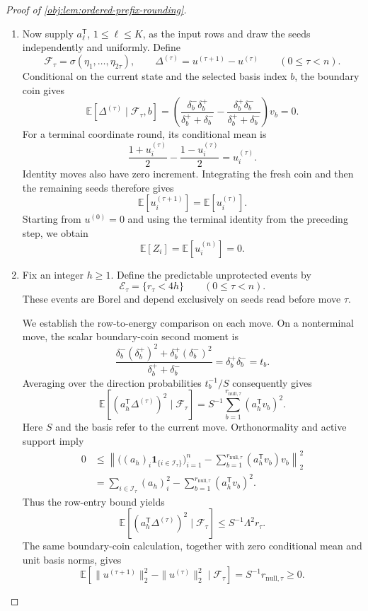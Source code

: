 \documentclass[11pt]{article}
\begin{document}
\begin{proof}[Proof of \cref{obj:lem:ordered-prefix-rounding}]
\begin{enumerate}
\item
Now supply \(a_\ell^{\mathsf T}\), \(1\leq\ell\leq K\), as the input rows and draw the seeds independently and uniformly. Define
\[
\mathcal F_\tau=\sigma(\eta_1,\ldots,\eta_{2\tau}),
\qquad
\Delta^{(\tau)}=u^{(\tau+1)}-u^{(\tau)}
\qquad(0\leq\tau<n).
\]
Conditional on the current state and the selected basis index \(b\), the boundary coin gives
\[
\mathbb E[\Delta^{(\tau)}\mid\mathcal F_\tau,b]
=
\left(
\frac{\delta_b^-\delta_b^+}{\delta_b^++\delta_b^-}
-
\frac{\delta_b^+\delta_b^-}{\delta_b^++\delta_b^-}
\right)v_b
=0.
\]
For a terminal coordinate round, its conditional mean is
\[
\frac{1+u_i^{(\tau)}}2
-
\frac{1-u_i^{(\tau)}}2
=u_i^{(\tau)}.
\]
Identity moves also have zero increment. Integrating the fresh coin and then the remaining seeds therefore gives
\[
\mathbb E[u_i^{(\tau+1)}]
=\mathbb E[u_i^{(\tau)}].
\]
Starting from \(u^{(0)}=0\) and using the terminal identity from the preceding step, we obtain
\[
\mathbb E[Z_i]=\mathbb E[u_i^{(n)}]=0.
\]

\item
Fix an integer \(h\geq1\). Define the predictable unprotected events by
\[
\mathcal E_\tau=\{r_\tau<4h\}
\qquad(0\leq\tau<n).
\]
These events are Borel and depend exclusively on seeds read before move \(\tau\).

We establish the row-to-energy comparison on each move. On a nonterminal move, the scalar boundary-coin second moment is
\[
\frac{\delta_b^-(\delta_b^+)^2+\delta_b^+(\delta_b^-)^2}
{\delta_b^++\delta_b^-}
=\delta_b^+\delta_b^-=t_b.
\]
Averaging over the direction probabilities \(t_b^{-1}/S\) consequently gives
\[
\mathbb E\!\left[(a_h^{\mathsf T}\Delta^{(\tau)})^2\mid\mathcal F_\tau\right]
=
S^{-1}\sum_{b=1}^{r_{\mathrm{null},\tau}}
(a_h^{\mathsf T}v_b)^2.
\]
Here \(S\) and the basis refer to the current move. Orthonormality and active support imply
\[
\begin{aligned}
0
&\leq
\left\|
\bigl((a_h)_i\mathbf1_{\{i\in\mathcal I_\tau\}}\bigr)_{i=1}^n
-
\sum_{b=1}^{r_{\mathrm{null},\tau}}
(a_h^{\mathsf T}v_b)v_b
\right\|_2^2\\
&=
\sum_{i\in\mathcal I_\tau}(a_h)_i^2
-
\sum_{b=1}^{r_{\mathrm{null},\tau}}(a_h^{\mathsf T}v_b)^2.
\end{aligned}
\]
Thus the row-entry bound yields
\[
\mathbb E\!\left[(a_h^{\mathsf T}\Delta^{(\tau)})^2\mid\mathcal F_\tau\right]
\leq S^{-1}\Lambda^2r_\tau.
\]
The same boundary-coin calculation, together with zero conditional mean and unit basis norms, gives
\[
\mathbb E\!\left[
\|u^{(\tau+1)}\|_2^2-\|u^{(\tau)}\|_2^2
\mid\mathcal F_\tau\right]
=S^{-1}r_{\mathrm{null},\tau}\geq0.
\]


\end{enumerate}
\end{proof}
\end{document}
